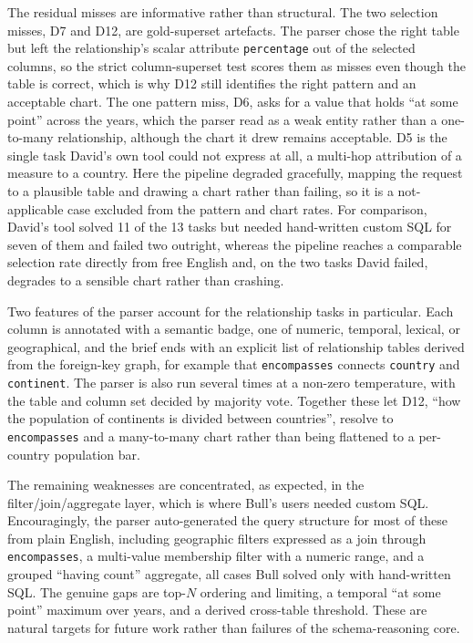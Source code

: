 The residual misses are informative rather than structural. The two selection misses, D7 and D12, are gold-superset artefacts. The parser chose the right table but left the relationship's scalar attribute \texttt{percentage} out of the selected columns, so the strict column-superset test scores them as misses even though the table is correct, which is why D12 still identifies the right pattern and an acceptable chart. The one pattern miss, D6, asks for a value that holds ``at some point'' across the years, which the parser read as a weak entity rather than a one-to-many relationship, although the chart it drew remains acceptable. D5 is the single task David's own tool could not express at all, a multi-hop attribution of a measure to a country. Here the pipeline degraded gracefully, mapping the request to a plausible table and drawing a chart rather than failing, so it is a not-applicable case excluded from the pattern and chart rates. For comparison, David's tool solved 11 of the 13 tasks but needed hand-written custom SQL for seven of them and failed two outright, whereas the pipeline reaches a comparable selection rate directly from free English and, on the two tasks David failed, degrades to a sensible chart rather than crashing.

Two features of the parser account for the relationship tasks in particular. Each column is annotated with a semantic badge, one of numeric, temporal, lexical, or geographical, and the brief ends with an explicit list of relationship tables derived from the foreign-key graph, for example that \texttt{encompasses} connects \texttt{country} and \texttt{continent}. The parser is also run several times at a non-zero temperature, with the table and column set decided by majority vote. Together these let D12, ``how the population of continents is divided between countries'', resolve to \texttt{encompasses} and a many-to-many chart rather than being flattened to a per-country population bar.

The remaining weaknesses are concentrated, as expected, in the filter/join/aggregate layer, which is where Bull's users needed custom SQL. Encouragingly, the parser auto-generated the query structure for most of these from plain English, including geographic filters expressed as a join through \texttt{encompasses}, a multi-value membership filter with a numeric range, and a grouped ``having count'' aggregate, all cases Bull solved only with hand-written SQL. The genuine gaps are top-$N$ ordering and limiting, a temporal ``at some point'' maximum over years, and a derived cross-table threshold. These are natural targets for future work rather than failures of the schema-reasoning core.

